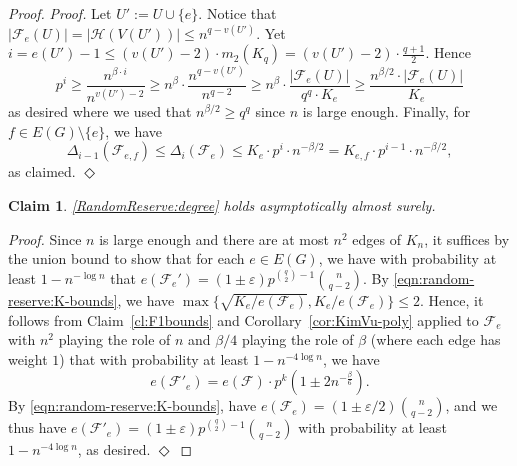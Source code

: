 \documentclass[11pt]{article}
\numberwithin{equation}{section}
\newcommand{\eps}{\varepsilon}
\newcommand{\mc}[1]{\mathcal{#1}}
\newcounter{i}
\theoremstyle{plain}
\newtheorem{claim}{Claim}[thm]
\newenvironment{proofclaim}[1][]%
{\noindent \emph{Proof.} {}{#1}{}}{\hfill
	$\Diamond$\vspace{1em}}
\theoremstyle{plain} %
\theoremstyle{definition}
\newcommand{\cF}{\mathcal{F}}
\begin{document}
\begin{proof}
\begin{proofclaim}
Let $U':= U\cup \{e\}$. Notice that $|\cF_{e}(U)| = |\mc{H}(V(U'))|\le n^{q-v(U')}$. Yet $i=e(U')-1 \le (v(U')-2)\cdot m_2(K_q) = (v(U')-2)\cdot \frac{q+1}{2}$. Hence
$$p^i \ge \frac{n^{\beta\cdot i}}{n^{v(U')-2}} \ge n^{\beta} \cdot \frac{n^{q-v(U')}}{n^{q-2}} \ge n^{\beta}\cdot \frac{|\cF_{e}(U)|}{q^q\cdot K_{e}} \ge \frac{n^{\beta/2}\cdot |\cF_{e}(U)|}{K_{e}}$$
as desired where we used that $n^{\beta/2} \ge q^q$ since $n$ is large enough.
Finally, for $f \in E(G)\setminus \{e\}$, we have
\begin{equation*}
    \Delta_{i-1}(\cF_{e,f}) \leq \Delta_i(\cF_{e}) \leq K_{e}\cdot p^{i}\cdot n^{-\beta/2} = K_{e,f}\cdot p^{i-1}\cdot n^{-\beta/2},
\end{equation*}
as claimed.
\end{proofclaim}
\begin{claim}\label{cl:Random-Reserve:degree}
\ref{RandomReserve:degree} holds asymptotically almost surely.
\end{claim}
\begin{proofclaim} 
Since $n$ is large enough and there are at most $n^2$ edges of $K_n$, it suffices by the union bound to show that for each $e\in E(G)$, we have with probability at least $1-n^{-\log n}$ that $e(\cF_{e}') = (1 \pm \eps)p^{\binom{q}{2} - 1}\binom{n}{q-2}$.
By \eqref{eqn:random-reserve:K-bounds}, we have $\max\{\sqrt{K_e / e(\cF_e)}, K_e / e(\cF_e)\} \leq 2$.  Hence, it follows from Claim~\ref{cl:F1bounds} and Corollary~\ref{cor:KimVu-poly} applied to $\cF_{e}$ with $n^2$ playing the role of $n$ and $\beta / 4$ playing the role of $\beta$ (where each edge has weight $1$) that with probability at least $1-n^{-4\log n}$, we have
\begin{equation*}
    e(\cF'_e) = e(\cF)\cdot p^k\left(1 \pm 2n^{-\frac{\beta}{6}}\right).
\end{equation*}
By \eqref{eqn:random-reserve:K-bounds}, have $e(\cF_e) = (1 \pm \eps/2)\binom{n}{q - 2}$, and we thus have $e(\cF'_e) = (1 \pm \eps)p^{\binom{q}{2}-1}\binom{n}{q - 2}$ with probability at least $1 - n^{-4\log n}$, as desired.
\end{proofclaim}


\end{proof}
\end{document}
